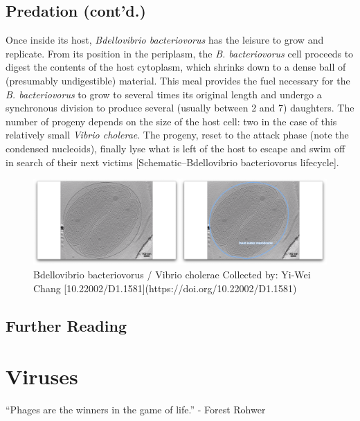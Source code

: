 \documentclass[]{tufte-book}
\begin{document}
\section{Predation (cont'd.)}\label{predation-contd.-1}

Once inside its host, \emph{Bdellovibrio bacteriovorus} has the leisure
to grow and replicate. From its position in the periplasm, the \emph{B.
bacteriovorus} cell proceeds to digest the contents of the host
cytoplasm, which shrinks down to a dense ball of (presumably
undigestible) material. This meal provides the fuel necessary for the
\emph{B. bacteriovorus} to grow to several times its original length and
undergo a synchronous division to produce several (usually between 2 and
7) daughters. The number of progeny depends on the size of the host
cell: two in the case of this relatively small \emph{Vibrio cholerae}.
The progeny, reset to the attack phase (note the condensed nucleoids),
finally lyse what is left of the host to escape and swim off in search
of their next victims {[}Schematic--Bdellovibrio bacteriovorus
lifecycle{]}.

\begin{figure}
\includegraphics{movie_stills/9_11} \caption[Bdellovibrio bacteriovorus / Vibrio cholerae Collected by]{Bdellovibrio bacteriovorus / Vibrio cholerae Collected by: Yi-Wei Chang [10.22002/D1.1581](https://doi.org/10.22002/D1.1581)}\label{fig:unnamed-chunk-172}
\end{figure}

\section{Further Reading}\label{further-reading-8}

\citet{christie2019} \citet{flemming2016} \citet{patz2019}
\citet{sockett2009}

\chapter{Viruses}\label{viruses}

``Phages are the winners in the game of life.'' - Forest Rohwer
\citet{rohwer2014}
\end{document}
